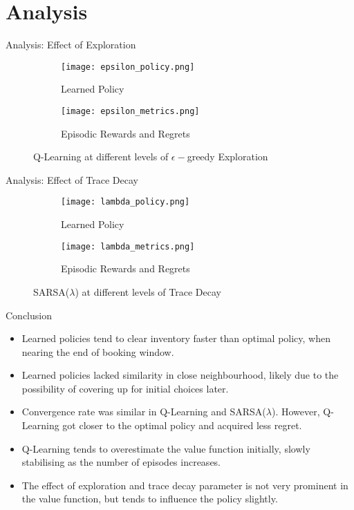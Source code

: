 \section{Analysis}

\begin{frame}{Analysis: Effect of Exploration}
\begin{figure}
    \centering
    \begin{subfigure}{\textwidth}
        \centering
        \texttt{[image: epsilon\_policy.png]}
        \caption{Learned Policy}
    \end{subfigure}
    \begin{subfigure}{\textwidth}
        \centering
        \texttt{[image: epsilon\_metrics.png]}
        \caption{Episodic Rewards and Regrets}
    \end{subfigure}
    \caption{Q-Learning at different levels of $\epsilon-$greedy Exploration}
\end{figure}
\end{frame}

\begin{frame}{Analysis: Effect of Trace Decay}
\begin{figure}
    \centering
    \begin{subfigure}{\textwidth}
        \centering
        \texttt{[image: lambda\_policy.png]}
        \caption{Learned Policy}
    \end{subfigure}
    \begin{subfigure}{\textwidth}
        \centering
        \texttt{[image: lambda\_metrics.png]}
        \caption{Episodic Rewards and Regrets}
    \end{subfigure}
    \caption{SARSA($\lambda$) at different levels of Trace Decay}
\end{figure}
\end{frame}

\begin{frame}{Conclusion}
\begin{itemize}
    \setlength\itemsep{1.5em}
    \item Learned policies tend to clear inventory faster than optimal policy, when nearing the end of booking window.
    \item Learned policies lacked similarity in close neighbourhood, likely due to the possibility of covering up for initial choices later.
    \item Convergence rate was similar in Q-Learning and SARSA($\lambda$). However, Q-Learning got closer to the optimal policy and acquired less regret.
    \item Q-Learning tends to overestimate the value function initially, slowly stabilising as the number of episodes increases.
    \item The effect of exploration and trace decay parameter is not very prominent in the value function, but tends to influence the policy slightly.
\end{itemize}
\end{frame}
